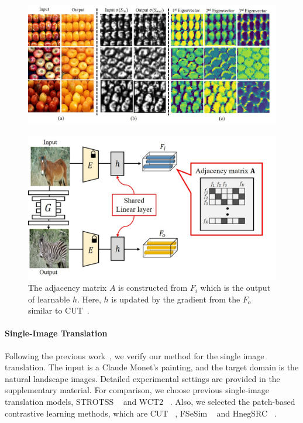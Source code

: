 \documentclass[letterpaper]{article} %
\begin{document}
\begin{figure}[t]
	\centering
	\includegraphics[width=0.85\linewidth]{figs/analy_21.jpg}
	\label{fig:analy}
\end{figure}

\begin{figure}[!t]
	\centering
	\includegraphics[width=0.85\linewidth]{figs/adj_FC_h.jpg}
	\caption{The adjacency matrix $A$ is constructed from $F_i$ which is the output of learnable $h$. Here, $h$ is updated by the gradient from the $F_o$ similar to CUT~\cite{cut}. } 
	\label{fig:adj_FC}
\end{figure}


\paragraph{Single-Image Translation}
Following the previous work~\cite{cut}, we verify our method for the single image translation. The input is a Claude Monet's painting, and the target domain is the natural landscape images. 
Detailed experimental settings are provided in the supplementary material. 
For comparison, we choose previous single-image translation models, STROTSS ~\cite{strotss} and WCT2 ~\cite{wct2}. Also, we selected the patch-based contrastive learning methods, which are CUT ~\cite{cut}, FSeSim ~\cite{sesim} and HnegSRC ~\cite{HnegSRC}.  
\end{document}
